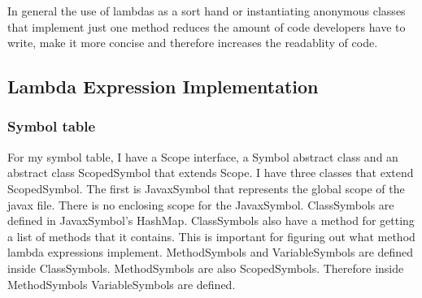 \documentclass[twocolumn,notitlepage]{report}
\begin{document}
In general the use of lambdas as a sort hand or instantiating anonymous classes
that implement just one method reduces the amount of code developers have to
write, make it more concise and therefore increases the readablity of code.


\subsection*{Lambda Expression Implementation}
\subsubsection*{Symbol table}
For my symbol table, I have a Scope interface, a Symbol abstract class and an
abstract class ScopedSymbol that extends Scope. I have three classes that
extend ScopedSymbol. The first is JavaxSymbol that represents the global scope
of the javax file. There is no enclosing scope for the JavaxSymbol.
ClassSymbols are defined in JavaxSymbol's HashMap. ClassSymbols also have a
method for getting a list of methods that it contains. This is important for
figuring out what method lambda expressions implement.  MethodSymbols and
VariableSymbols are defined inside ClassSymbols.  MethodSymbols are also
ScopedSymbols. Therefore inside MethodSymbols VariableSymbols are defined.
\end{document}
